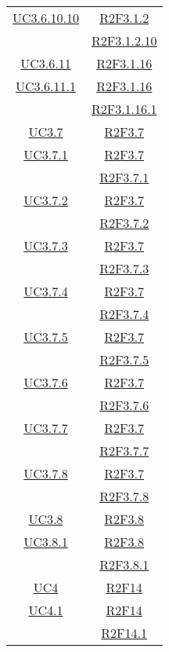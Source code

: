 \begin{longtable}{|c|c|}
\hline
\hyperlink{UC3.6.10.10}{UC3.6.10.10} & \hyperlink{R2F3.1.2}{R2F3.1.2}\\
& \hyperlink{R2F3.1.2.10}{R2F3.1.2.10}\\
\hline
\hyperlink{UC3.6.11}{UC3.6.11} & \hyperlink{R2F3.1.16}{R2F3.1.16}\\
\hline
\hyperlink{UC3.6.11.1}{UC3.6.11.1} & \hyperlink{R2F3.1.16}{R2F3.1.16}\\
& \hyperlink{R2F3.1.16.1}{R2F3.1.16.1}\\
\hline
\hyperlink{UC3.7}{UC3.7} & \hyperlink{R2F3.7}{R2F3.7}\\
\hline
\hyperlink{UC3.7.1}{UC3.7.1} & \hyperlink{R2F3.7}{R2F3.7}\\
& \hyperlink{R2F3.7.1}{R2F3.7.1}\\
\hline
\hyperlink{UC3.7.2}{UC3.7.2} & \hyperlink{R2F3.7}{R2F3.7}\\
& \hyperlink{R2F3.7.2}{R2F3.7.2}\\
\hline
\hyperlink{UC3.7.3}{UC3.7.3} & \hyperlink{R2F3.7}{R2F3.7}\\
& \hyperlink{R2F3.7.3}{R2F3.7.3}\\
\hline
\hyperlink{UC3.7.4}{UC3.7.4} & \hyperlink{R2F3.7}{R2F3.7}\\
& \hyperlink{R2F3.7.4}{R2F3.7.4}\\
\hline
\hyperlink{UC3.7.5}{UC3.7.5} & \hyperlink{R2F3.7}{R2F3.7}\\
& \hyperlink{R2F3.7.5}{R2F3.7.5}\\
\hline
\hyperlink{UC3.7.6}{UC3.7.6} & \hyperlink{R2F3.7}{R2F3.7}\\
& \hyperlink{R2F3.7.6}{R2F3.7.6}\\
\hline
\hyperlink{UC3.7.7}{UC3.7.7} & \hyperlink{R2F3.7}{R2F3.7}\\
& \hyperlink{R2F3.7.7}{R2F3.7.7}\\
\hline
\hyperlink{UC3.7.8}{UC3.7.8} & \hyperlink{R2F3.7}{R2F3.7}\\
& \hyperlink{R2F3.7.8}{R2F3.7.8}\\
\hline
\hyperlink{UC3.8}{UC3.8} & \hyperlink{R2F3.8}{R2F3.8}\\
\hline
\hyperlink{UC3.8.1}{UC3.8.1} & \hyperlink{R2F3.8}{R2F3.8}\\
& \hyperlink{R2F3.8.1}{R2F3.8.1}\\
\hline
\hyperlink{UC4}{UC4} & \hyperlink{R2F14}{R2F14}\\
\hline
\hyperlink{UC4.1}{UC4.1} & \hyperlink{R2F14}{R2F14}\\
& \hyperlink{R2F14.1}{R2F14.1}\\

\end{longtable}
